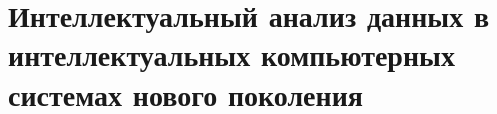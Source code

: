 \chapter{Интеллектуальный анализ данных в интеллектуальных компьютерных системах нового поколения}
\label{chapter_data_mining}


%